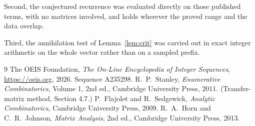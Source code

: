 \documentclass[11pt,a4paper]{article}
\theoremstyle{plain}
\theoremstyle{definition}
\begin{document}
Second, the conjectured recurrence was evaluated directly on those published terms, with no
matrices involved, and holds wherever the proved range and the data overlap.

Third, the annihilation test of Lemma~\ref{lem:crit} was carried out in exact integer
arithmetic on the whole vector rather than on a sampled prefix.

\begin{thebibliography}{9}
 The OEIS Foundation, \emph{The On-Line Encyclopedia of Integer
Sequences}, \url{https://oeis.org}, 2026. Sequence A235298.
 R.~P.~Stanley, \emph{Enumerative Combinatorics}, Volume 1, 2nd ed.,
Cambridge University Press, 2011. (Transfer-matrix method, Section 4.7.)
 P.~Flajolet and R.~Sedgewick, \emph{Analytic Combinatorics}, Cambridge
University Press, 2009.
 R.~A.~Horn and C.~R.~Johnson, \emph{Matrix Analysis}, 2nd ed., Cambridge
University Press, 2013.
\end{thebibliography}
\end{document}
